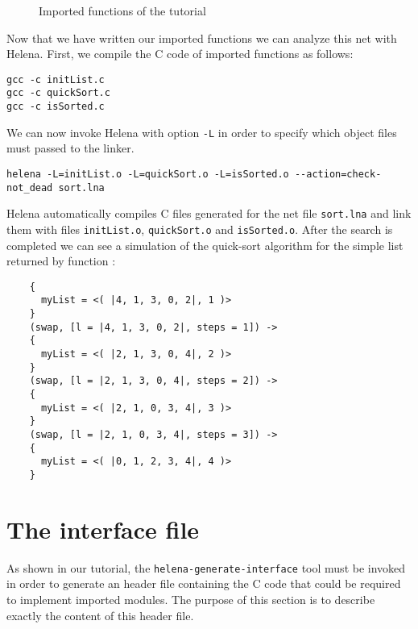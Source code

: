 \begin{figure}
  {}
  {}
  {}
  \caption{Imported functions of the tutorial}
  \label{fig:imported-code}
\end{figure}

Now that we have written our imported functions we can analyze this
net with Helena.  First, we compile the C code of imported functions
as follows:
\begin{verbatim}
gcc -c initList.c
gcc -c quickSort.c
gcc -c isSorted.c
\end{verbatim}

We can now invoke Helena with option \verb+-L+ in order to specify
which object files must passed to the linker.
\begin{verbatim}
helena -L=initList.o -L=quickSort.o -L=isSorted.o --action=check-not_dead sort.lna
\end{verbatim}

Helena automatically compiles C files generated for the net file
\verb+sort.lna+ and link them with files \verb+initList.o+,
\verb+quickSort.o+ and \verb+isSorted.o+.  After the search is
completed we can see a simulation of the quick-sort algorithm for the
simple list returned by function :

\begin{lstlisting}
    {
      myList = <( |4, 1, 3, 0, 2|, 1 )>
    }
    (swap, [l = |4, 1, 3, 0, 2|, steps = 1]) ->    
    {
      myList = <( |2, 1, 3, 0, 4|, 2 )>
    }
    (swap, [l = |2, 1, 3, 0, 4|, steps = 2]) ->
    {
      myList = <( |2, 1, 0, 3, 4|, 3 )>
    }
    (swap, [l = |2, 1, 0, 3, 4|, steps = 3]) ->
    {
      myList = <( |0, 1, 2, 3, 4|, 4 )>
    }
\end{lstlisting}
\section{The interface file}
As shown in our tutorial, the \verb+helena-generate-interface+ tool
must be invoked in order to generate an header file containing the C
code that could be required to implement imported modules.  The
purpose of this section is to describe exactly the content of this
header file.
